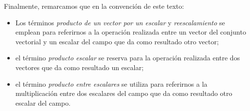 \begin{tcolorbox}
\vspace{5mm}
\hspace{2.5mm} Finalmente, remarcamos que en la convención de este texto: 
    \begin{itemize}
        \item Los términos \emph{producto de un vector por un escalar} y \emph{reescalamiento} se emplean para referirnos a la operación realizada entre un vector del conjunto vectorial y un escalar del campo que da como resultado otro vector;
        \item el término \emph{producto escalar} se reserva para la operación realizada entre dos vectores que da como resultado un escalar;
        \item el término \emph{producto entre escalares} se utiliza para referirnos a la multiplicación entre dos escalares del campo que da como resultado otro escalar del campo.
    \end{itemize}





\end{tcolorbox}
